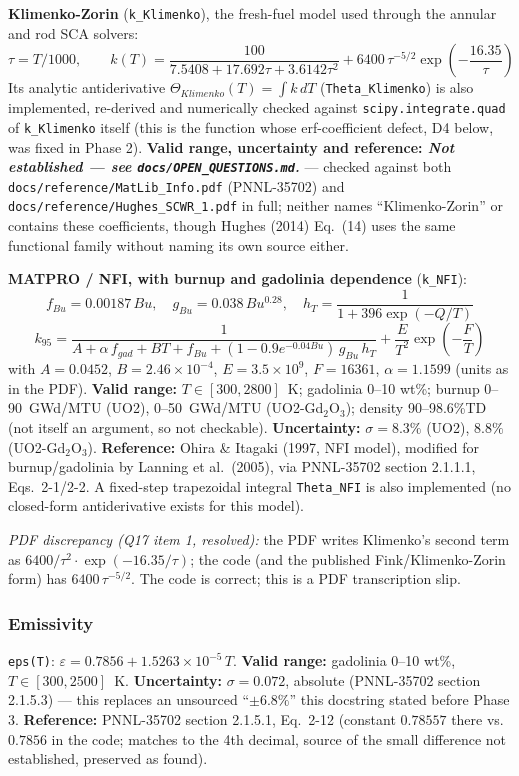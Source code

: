 \documentclass[11pt]{article}
\newcommand{\code}[1]{\texttt{#1}}
\newcommand{\notest}{\textit{Not established --- see \code{docs/OPEN\_QUESTIONS.md}.}}
\begin{document}
\textbf{Klimenko-Zorin} (\code{k\_Klimenko}), the fresh-fuel model used through the
annular and rod SCA solvers:
\[
  \tau = T/1000, \qquad
  k(T) = \frac{100}{7.5408 + 17.692\tau + 3.6142\tau^2} + 6400\,\tau^{-5/2}\exp\!\left(-\frac{16.35}{\tau}\right)
\]
Its analytic antiderivative $\Theta_{Klimenko}(T) = \int k\,dT$ (\code{Theta\_Klimenko})
is also implemented, re-derived and numerically checked against
\code{scipy.integrate.quad} of \code{k\_Klimenko} itself (this is the function whose
erf-coefficient defect, D4 below, was fixed in Phase 2). \textbf{Valid range,
uncertainty and reference: \notest{}} --- checked against both
\code{docs/reference/MatLib\_Info.pdf} (PNNL-35702) and
\code{docs/reference/Hughes\_SCWR\_1.pdf} in full; neither names ``Klimenko-Zorin'' or
contains these coefficients, though Hughes (2014) Eq.\ (14) uses the same functional
family without naming its own source either.

\textbf{MATPRO / NFI, with burnup and gadolinia dependence} (\code{k\_NFI}):
\[
  f_{Bu} = 0.00187\,Bu, \quad g_{Bu} = 0.038\,Bu^{0.28}, \quad
  h_T = \frac{1}{1+396\exp(-Q/T)}
\]
\[
  k_{95} = \frac{1}{A + \alpha\,f_{gad} + BT + f_{Bu} + (1-0.9e^{-0.04Bu})\,g_{Bu}\,h_T} + \frac{E}{T^2}\exp\!\left(-\frac{F}{T}\right)
\]
with $A=0.0452$, $B=2.46\times10^{-4}$, $E=3.5\times10^9$, $F=16361$, $\alpha=1.1599$
(units as in the PDF). \textbf{Valid range:} $T\in[300,2800]$~K; gadolinia 0--10 wt\%;
burnup 0--90~GWd/MTU (UO2), 0--50~GWd/MTU (UO2-Gd$_2$O$_3$); density 90--98.6\%TD (not
itself an argument, so not checkable). \textbf{Uncertainty:} $\sigma=8.3\%$ (UO2),
$8.8\%$ (UO2-Gd$_2$O$_3$). \textbf{Reference:} Ohira \& Itagaki (1997, NFI model),
modified for burnup/gadolinia by Lanning et al.\ (2005), via PNNL-35702 section 2.1.1.1,
Eqs.\ 2-1/2-2. A fixed-step trapezoidal integral \code{Theta\_NFI} is also implemented
(no closed-form antiderivative exists for this model).

\textit{PDF discrepancy (Q17 item 1, resolved):} the PDF writes Klimenko's second term
as $6400/\tau^2\cdot\exp(-16.35/\tau)$; the code (and the published Fink/Klimenko-Zorin
form) has $6400\,\tau^{-5/2}$. The code is correct; this is a PDF transcription slip.

\subsubsection{Emissivity}

\code{eps(T)}: $\varepsilon = 0.7856 + 1.5263\times10^{-5}\,T$. \textbf{Valid range:}
gadolinia 0--10 wt\%, $T\in[300,2500]$~K. \textbf{Uncertainty:} $\sigma=0.072$,
absolute (PNNL-35702 section 2.1.5.3) --- this replaces an unsourced ``$\pm6.8\%$''
this docstring stated before Phase 3. \textbf{Reference:} PNNL-35702 section 2.1.5.1,
Eq.\ 2-12 (constant $0.78557$ there vs.\ $0.7856$ in the code; matches to the 4th
decimal, source of the small difference not established, preserved as found).
\end{document}
